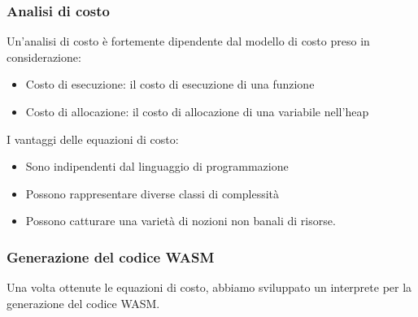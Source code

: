 \documentclass[xcolor=dvipsnames]{beamer}
\begin{document}
\begin{frame}
    \frametitle{Analisi di costo}
    Un'analisi di costo è fortemente dipendente dal modello di costo preso in considerazione:
    \begin{itemize}
        \item \alert{Costo di esecuzione}: il costo di esecuzione di una funzione
        \item \alert{Costo di allocazione}: il costo di allocazione di una variabile nell'heap
    \end{itemize}
    I vantaggi delle equazioni di costo:
    \begin{itemize}
        \item Sono \alert{indipendenti} dal linguaggio di programmazione
        \item Possono rappresentare diverse classi di \alert{complessità}
        \item Possono catturare una varietà di nozioni non banali di risorse.
    \end{itemize}
\end{frame}
\begin{frame}
    \frametitle{Generazione del codice WASM}
    Una volta ottenute le equazioni di costo, abbiamo sviluppato un interprete per la generazione del codice WASM.
\end{frame}
\end{document}

